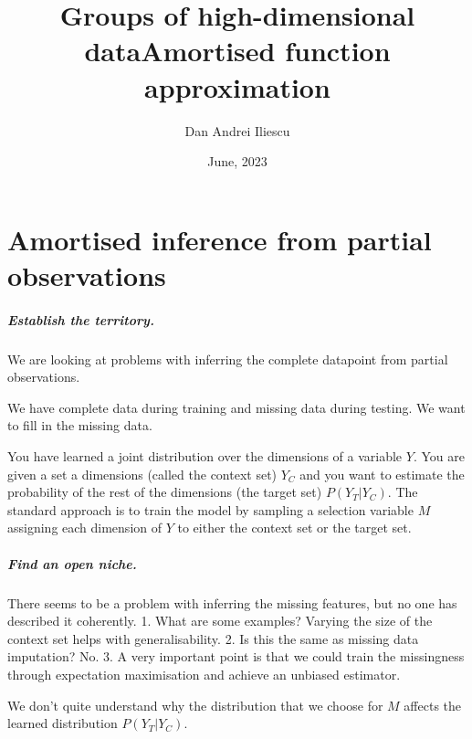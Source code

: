 \documentclass[a4paper,12pt,twoside,openright]{report}
\title{\bf Groups of high-dimensional data}
\author{Dan Andrei Iliescu}
\date{June, 2023}
\title{Amortised function approximation}
\begin{document}
\allsectionsfont{\sffamily}


\chapter{Amortised inference from partial observations}

\paragraph{Establish the territory.} We are looking at problems with inferring the complete datapoint from partial observations.

We have complete data during training and missing data during testing. We want to fill in the missing data.

You have learned a joint distribution over the dimensions of a variable $Y$. You are given a set a dimensions (called the context set) $Y_C$ and you want to estimate the probability of the rest of the dimensions (the target set) $P(Y_T | Y_C)$. The standard approach is to train the model by sampling a selection variable $M$ assigning each dimension of $Y$ to either the context set or the target set.

\paragraph{Find an open niche.} There seems to be a problem with inferring the missing features, but no one has described it coherently.
   1. What are some examples? Varying the size of the context set helps with generalisability. 
   2. Is this the same as missing data imputation? No.
   3. A very important point is that we could train the missingness through expectation maximisation and achieve an unbiased estimator.

We don't quite understand why the distribution that we choose for $M$ affects the learned distribution $P(Y_T | Y_C)$. 
\end{document}
